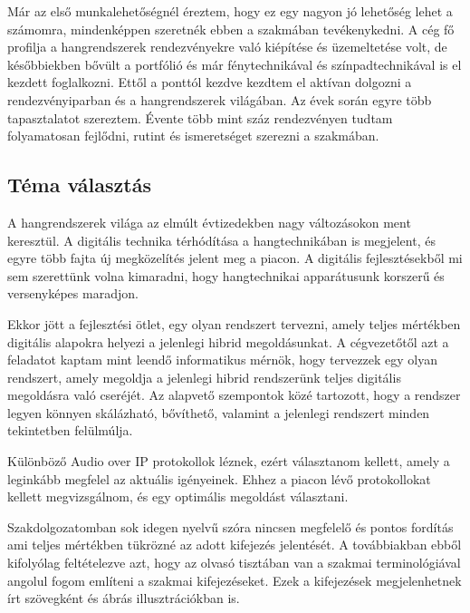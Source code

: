 Már az első munkalehetőségnél éreztem, hogy ez egy nagyon jó lehetőség lehet a számomra, mindenképpen szeretnék ebben a szakmában tevékenykedni.
A cég fő profilja a hangrendszerek rendezvényekre való kiépítése és üzemeltetése volt, de későbbiekben bővült a portfólió és már fénytechnikával és színpadtechnikával is el kezdett foglalkozni. 
Ettől a ponttól kezdve kezdtem el aktívan dolgozni a rendezvényiparban és a hangrendszerek világában. Az évek során egyre több tapasztalatot
szereztem. Évente több mint száz rendezvényen tudtam folyamatosan fejlődni, rutint és ismeretséget szerezni a szakmában.

\subsection{Téma választás}

A hangrendszerek világa az elmúlt évtizedekben nagy változásokon ment keresztül. A digitális technika térhódítása a hangtechnikában is megjelent, és egyre több fajta új megközelítés jelent meg a piacon.
A digitális fejlesztésekből mi sem szerettünk volna kimaradni, hogy hangtechnikai apparátusunk korszerű és versenyképes maradjon.

Ekkor jött a fejlesztési ötlet, egy olyan rendszert tervezni, amely teljes mértékben digitális alapokra helyezi a jelenlegi hibrid megoldásunkat. A cégvezetőtől azt a feladatot kaptam mint leendő informatikus mérnök,
hogy tervezzek egy olyan rendszert, amely megoldja a jelenlegi hibrid rendszerünk teljes digitális megoldásra való cseréjét. 
Az alapvető szempontok közé tartozott, hogy a rendszer legyen könnyen skálázható, bővíthető, valamint a jelenlegi rendszert minden tekintetben felülmúlja.

Különböző Audio over IP protokollok léznek, ezért választanom kellett, amely a leginkább megfelel az aktuális igényeinek.
Ehhez a piacon lévő protokollokat kellett megvizsgálnom, és egy optimális megoldást választani. 

Szakdolgozatomban sok idegen nyelvű szóra nincsen megfelelő és pontos fordítás ami teljes mértékben tükrözné az adott kifejezés jelentését.
A továbbiakban ebből kifolyólag feltételezve azt, hogy az olvasó tisztában van a szakmai terminológiával angolul fogom említeni a szakmai kifejezéseket.
Ezek a kifejezések megjelenhetnek írt szövegként és ábrás illusztrációkban is. 
